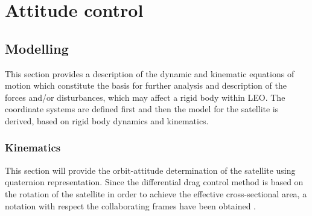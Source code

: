 \chapter{Attitude control}
\section{Modelling}
This section provides a description of the dynamic and kinematic equations of motion which constitute the basis for further analysis and description of the forces and/or disturbances, which may affect a rigid body within LEO. The coordinate systems are defined first and then the model for the satellite is derived, based on rigid body dynamics and kinematics. 
%
\subsection{Kinematics}
This section will provide the orbit-attitude determination of the satellite using quaternion representation. Since the differential drag control method is based on the rotation of the satellite in order to achieve the effective cross-sectional area, a notation with respect the collaborating frames have been obtained .

